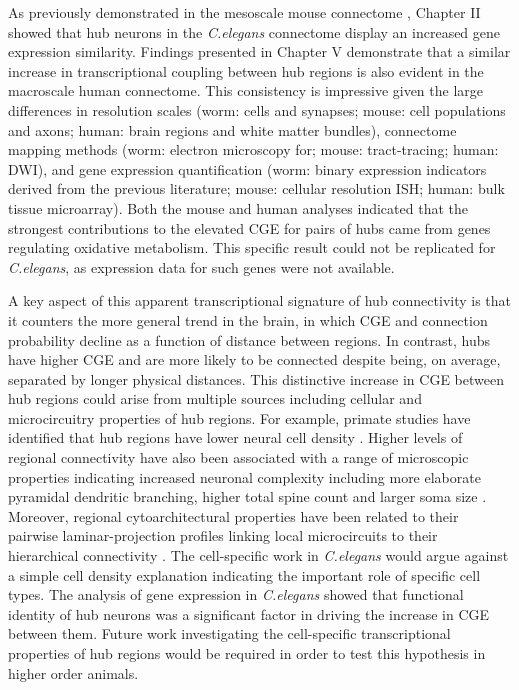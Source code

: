 As previously demonstrated in the mesoscale mouse connectome \citep{Fulcher2016}, Chapter II showed that hub neurons in the \textit{C.elegans} connectome display an increased gene expression similarity. Findings presented in Chapter V demonstrate that a similar increase in transcriptional coupling between hub regions is also evident in the macroscale human connectome. This consistency is impressive given the large differences in resolution scales (worm: cells and synapses; mouse: cell populations and axons; human: brain regions and white matter bundles), connectome mapping methods (worm: electron microscopy for; mouse: tract-tracing; human: DWI), and gene expression quantification (worm: binary expression indicators derived from the previous literature; mouse: cellular resolution ISH; human: bulk tissue microarray). Both the mouse and human analyses indicated that the strongest contributions to the elevated CGE for pairs of hubs came from genes regulating oxidative metabolism. This specific result could not be replicated for \textit{C.elegans}, as expression data for such genes were not available.

A key aspect of this apparent transcriptional signature of hub connectivity is that it counters the more general trend in the brain, in which CGE and connection probability decline as a function of distance between regions. In contrast, hubs have higher CGE and are more likely to be connected despite being, on average, separated by longer physical distances. This distinctive increase in CGE between hub regions could arise from multiple sources including cellular and microcircuitry properties of hub regions. For example, primate studies have identified that hub regions have lower neural cell density \citep{Beul2017,Scholtens2014}. Higher levels of regional connectivity have also been associated with a range of microscopic properties indicating increased neuronal complexity including more elaborate pyramidal dendritic branching, higher total spine count and larger soma size \citep{Scholtens2014}. Moreover, regional cytoarchitectural properties have been related to their pairwise laminar-projection profiles linking local microcircuits to their hierarchical connectivity \citep{Barbas}. The cell-specific work in \textit{C.elegans} would argue against a simple cell density explanation indicating the important role of specific cell types. The analysis of gene expression in \textit{C.elegans} showed that functional identity of hub neurons was a significant factor in driving the increase in CGE between them. Future work investigating the cell-specific transcriptional properties of hub regions would be required in order to test this hypothesis in higher order animals.

